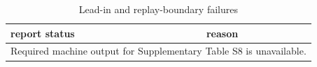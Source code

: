 \begin{table}[htbp]
\centering
\caption{Lead-in and replay-boundary failures}
\label{tab:s8}
\begin{tabular}{ll}
\hline
report status & reason \\
\hline
\multicolumn{2}{l}{Required machine output for Supplementary Table S8 is unavailable.} \\
\hline
\end{tabular}
\end{table}
